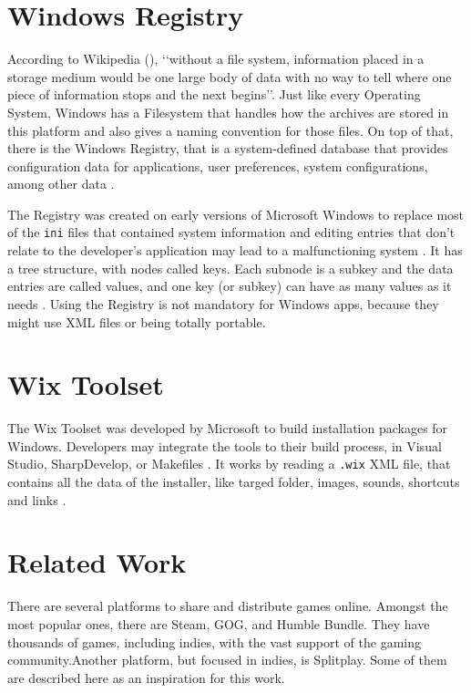 \section{Windows Registry}
\label{sec:win_filesystem}

According to Wikipedia (\citeyear{wikipedia2017filesystem}), \lq\lq without a file system, information placed in a storage medium would be one large body of data with no way to tell where one piece of information stops and the next begins\rq\rq{}. Just like every Operating System, Windows has a Filesystem that handles how the archives are stored in this platform and also gives a naming convention for those files. On top of that, there is the Windows Registry, that is a system-defined database \cite{windowsregistry2017} that provides configuration data for applications, user preferences, system configurations, among other data \cite{fisher_2017}.

The Registry was created on early versions of Microsoft Windows to replace most of the \texttt{ini} files that contained system information and editing entries that don't relate to the developer's application may lead to a malfunctioning system \cite{microsoft2017registryinfo}. It has a tree structure, with nodes called keys. Each subnode is a subkey and the data entries are called values, and one key (or subkey) can have as many values as it needs \cite{windows2017registrystructure}. Using the Registry is not mandatory for Windows apps, because they might use XML files or being totally portable. \cite{fisher_2017}


\section{Wix Toolset}
\label{sec:wix_toolset}

The Wix Toolset was developed by Microsoft to build installation packages for Windows. Developers may integrate the tools to their build process, in Visual Studio, SharpDevelop, or Makefiles \cite{firegiant2017tutorial}. It works by reading a \texttt{.wix} XML file, that contains all the data of the installer, like targed folder, images, sounds, shortcuts and links \cite{wix2017wikipedia}.

\section{Related Work}
\label {sec:relate_work}

There are several platforms to share and distribute games online. Amongst the most popular ones, there are Steam, GOG, and Humble Bundle. They have thousands of games, including indies, with the vast support of the gaming community.Another platform, but focused in indies, is Splitplay. Some of them are described here as an inspiration for this work.

